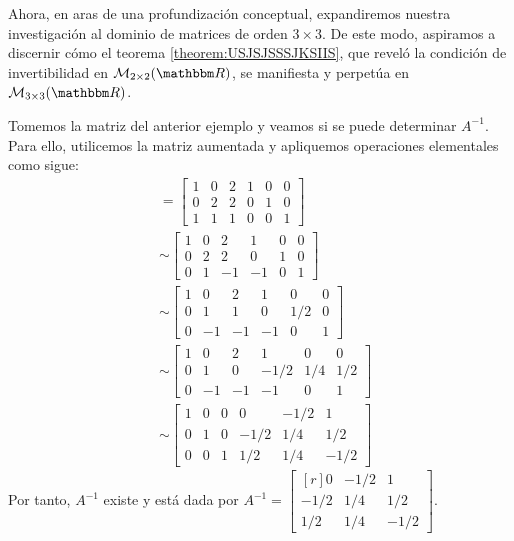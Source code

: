 Ahora, en aras de una profundización conceptual, expandiremos nuestra investigación al dominio de matrices de orden $3 \times 3$. De este modo, aspiramos a discernir cómo el teorema \ref{theorem:USJSJSSSJKSIIS}, que reveló la condición de invertibilidad en $\mathcal{M}_{2 \times 2}(\RR)$, se manifiesta y perpetúa en $\mathcal{M}_{3 \times 3}(\RR)$.\newpage

Tomemos la matriz del anterior ejemplo y veamos si se puede determinar $A^{-1}$. Para ello, utilicemos la matriz aumentada y apliquemos operaciones elementales como sigue:
\begin{align*}
    [A \mid I] & = \left[\begin{array}{ccc|ccc}
        1 & 0 & 2 & 1 & 0 & 0 \\
        0 & 2 & 2 & 0 & 1 & 0 \\
        1 & 1 & 1 & 0 & 0 & 1
    \end{array}\right] \\
    & \sim \left[\begin{array}{rrr|rrr}
        1 & 0 & 2 & 1 & 0 & 0 \\
        0 & 2 & 2 & 0 & 1 & 0 \\
        0 & 1 & -1 & -1 & 0 & 1
    \end{array}\right] \\
    & \sim \left[\begin{array}{rrr|rrr}
        1 & 0 & 2 & 1 & 0 & 0 \\
        0 & 1 & 1 & 0 & 1/2 & 0 \\
        0 & -1 & -1 & -1 & 0 & 1
    \end{array}\right] \\
    & \sim \left[\begin{array}{rrr|rrr}
        1 & 0 & 2 & 1 & 0 & 0 \\
        0 & 1 & 0 & -1/2 & 1/4 & 1/2 \\
        0 & -1 & -1 & -1 & 0 & 1
    \end{array}\right] \\
    & \sim \left[\begin{array}{rrr|rrr}
        1 & 0 & 0 & 0 & -1/2 & 1 \\
        0 & 1 & 0 & -1/2 & 1/4 & 1/2 \\
        0 & 0 & 1 & 1/2 & 1/4 & -1/2
    \end{array}\right]
\end{align*}
Por tanto, $A^{-1}$ existe y está dada por $A^{-1} = \begin{bmatrix*}[r]
    0 & -1/2 & 1 \\
    -1/2 & 1/4 & 1/2 \\
    1/2 & 1/4 & -1/2
\end{bmatrix*}.$


